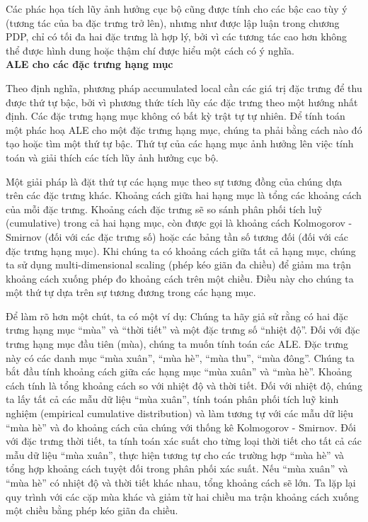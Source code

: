 Các phác họa tích lũy ảnh hưởng cục bộ cũng được tính cho các bậc cao tùy ý (tương tác của ba đặc trưng trở lên), nhưng như được lập luận trong chương PDP, chỉ có tối đa hai đặc trưng là hợp lý, bởi vì các tương tác cao hơn không thể được hình dung hoặc thậm chí được hiểu một cách có ý nghĩa.\\
\textbf{ALE cho các đặc trưng hạng mục}

Theo định nghĩa, phương pháp accumulated local cần các giá trị đặc trưng để thu được thứ tự bậc, bởi vì phương thức tích lũy các đặc trưng theo một hướng nhất định. Các đặc trưng hạng mục không có bất kỳ trật tự tự nhiên. Để tính toán một phác hoạ ALE cho một đặc trưng hạng mục, chúng ta phải bằng cách nào đó tạo hoặc tìm một thứ tự bậc. Thứ tự của các hạng mục ảnh hưởng lên việc tính toán và giải thích các tích lũy ảnh hưởng cục bộ. 

Một giải pháp là đặt thứ tự các hạng mục theo sự tương đồng của chúng dựa trên các đặc trưng khác. Khoảng cách giữa hai hạng mục là tổng các khoảng cách của mỗi đặc trưng. Khoảng cách đặc trưng sẽ so sánh phân phối tích luỹ (cumulative) trong cả hai hạng mục, còn được gọi là khoảng cách Kolmogorov - Smirnov (đối với các đặc trưng số) hoặc các bảng tần số tương đối (đối với các đặc trưng hạng mục). Khi chúng ta có khoảng cách giữa tất cả hạng mục, chúng ta sử dụng multi-dimensional scaling (phép kéo giãn đa chiều) để giảm ma trận khoảng cách xuống phép đo khoảng cách trên một chiều. Điều này cho chúng ta một thứ tự dựa trên sự tương đương trong các hạng mục.

Để làm rõ hơn một chút, ta có một ví dụ: Chúng ta hãy giả sử rằng có hai đặc trưng hạng mục ``mùa'' và ``thời tiết'' và một đặc trưng số ``nhiệt độ''. Đối với đặc trưng hạng mục đầu tiên (mùa), chúng ta muốn tính toán các ALE. Đặc trưng này có các danh mục ``mùa xuân'', ``mùa hè'', ``mùa thu'', ``mùa đông''. Chúng ta bắt đầu tính khoảng cách giữa các hạng mục ``mùa xuân'' và ``mùa hè''. Khoảng cách tính là tổng khoảng cách so với nhiệt độ và thời tiết. Đối với nhiệt độ, chúng ta lấy tất cả các mẫu dữ liệu ``mùa xuân'', tính toán phân phối tích luỹ kinh nghiệm (empirical cumulative distribution) và làm tương tự với các mẫu dữ liệu ``mùa hè'' và đo khoảng cách của chúng với thống kê Kolmogorov - Smirnov. Đối với đặc trưng thời tiết, ta tính toán xác suất cho từng loại thời tiết cho tất cả các mẫu dữ liệu ``mùa xuân'', thực hiện tương tự cho các trường hợp ``mùa hè'' và tổng hợp khoảng cách tuyệt đối trong phân phối xác suất. Nếu ``mùa xuân'' và ``mùa hè'' có nhiệt độ và thời tiết khác nhau, tổng khoảng cách sẽ lớn. Ta lặp lại quy trình với các cặp mùa khác và giảm từ hai chiều ma trận khoảng cách xuống một chiều bằng phép kéo giãn đa chiều.

